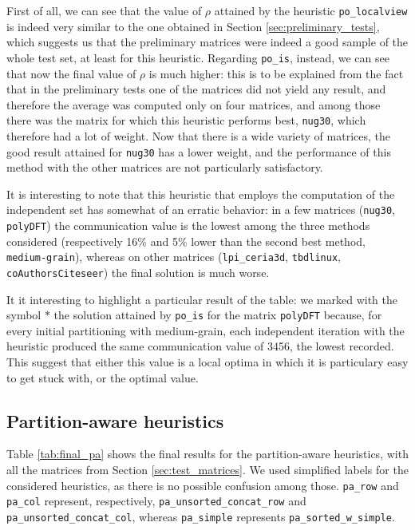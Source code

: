 First of all, we can see that the value of $\rho$ attained by the heuristic \verb|po_localview| is indeed very similar to the one obtained in Section \ref{sec:preliminary_tests}, which suggests us that the preliminary matrices were indeed a good sample of the whole test set, at least for this heuristic. Regarding \verb|po_is|, instead, we can see that now the final value of $\rho$ is much higher: this is to be explained from the fact that in the preliminary tests one of the matrices did not yield any result, and therefore the average was computed only on four matrices, and among those there was the matrix for which this heuristic performs best, \verb|nug30|, which therefore had a lot of weight. Now that there is a wide variety of matrices, the good result attained for \verb|nug30| has a lower weight, and the performance of this method with the other matrices are not particularly satisfactory.

It is interesting to note that this heuristic that employs the computation of the independent set has somewhat of an erratic behavior: in a few matrices (\verb|nug30|, \verb|polyDFT|) the communication value is the lowest among the three methods considered (respectively 16\% and 5\% lower than the second best method, \verb|medium-grain|), whereas on other matrices (\verb|lpi_ceria3d|, \verb|tbdlinux|, \verb|coAuthorsCiteseer|) the final solution is much worse.

It it interesting to highlight a particular result of the table: we marked with the symbol $*$ the solution attained by \verb|po_is| for the matrix \verb|polyDFT| because, for every initial partitioning with medium-grain, each independent iteration with the heuristic produced the same communication value of 3456, the lowest recorded. This suggest that either this value is a local optima in which it is particulary easy to get stuck with, or the optimal value.

\subsection{Partition-aware heuristics}

Table \ref{tab:final_pa} shows the final results for the partition-aware heuristics, with all the matrices from Section \ref{sec:test_matrices}. We used simplified labels for the considered heuristics, as there is no possible confusion among those. \verb|pa_row| and \verb|pa_col| represent, respectively, \verb|pa_unsorted_concat_row| and \verb|pa_unsorted_concat_col|, whereas \verb|pa_simple| represents \verb|pa_sorted_w_simple|.


